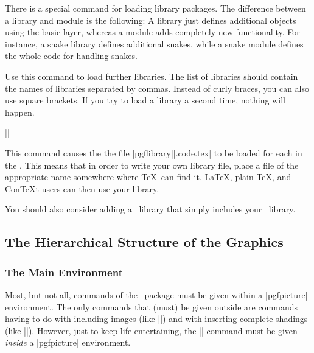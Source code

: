 There is a special command for loading library packages. The
difference between a library and module is the following: A library
just defines additional objects using the basic layer, whereas a
module adds completely new functionality. For instance, a snake
library defines additional snakes, while a snake module defines the
whole code for handling snakes.

\begin{command}{\usepgflibrary{}}
  Use this command to load further libraries. The list of libraries
  should contain the names of libraries separated by commas. Instead
  of curly braces, you can also use square brackets. If you try to
  load a library a second time, nothing will happen. 

  \example ||

  This command causes the the file
  |pgflibrary||.code.tex| to be loaded for each  in
  the . This means that in order to write your
  own library file, place a file of the appropriate name somewhere
  where \TeX\ can find it. \LaTeX, plain \TeX, and Con\TeX t 
  users can then use your library.

  You should also consider adding a \tikzname\ library that simply
  includes your \pgfname\ library.
\end{command}



\subsection{The Hierarchical Structure of the Graphics}

\subsubsection{The Main Environment}


Most, but not all, commands of the \pgfname\ package must be given
within a |{pgfpicture}| environment. The only commands that (must) be
given outside are commands having to do with including images (like
|\pgfuseimage|) and with inserting complete shadings (like
|\pgfuseshading|). However, just to keep life entertaining, the
|\pgfshadepath| command must be given \emph{inside} a |{pgfpicture}|
environment.


